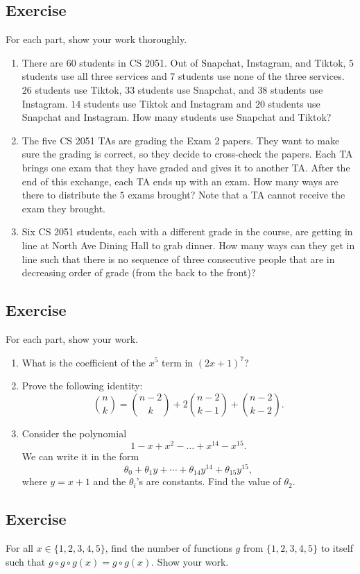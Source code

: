 \documentclass{article}
\newcounter{counter}
\newcommand{\Exercise}{Exercise \stepcounter{counter}\thecounter}
\begin{document}
\subsection*{\Exercise}
    For each part, show your work thoroughly.
    \begin{enumerate}
        \item There are $60$ students in CS 2051. Out of Snapchat, Instagram, and Tiktok, $5$ students use all three services and $7$ students use none of the three services. $26$ students use Tiktok, $33$ students use Snapchat, and $38$ students use Instagram. $14$ students use Tiktok and Instagram and $20$ students use Snapchat and Instagram. How many students use Snapchat and Tiktok?
        \item The five CS 2051 TAs are grading the Exam 2 papers. They want to make sure the grading is correct, so they decide to cross-check the papers. Each TA brings one exam that they have graded and gives it to another TA. After the end of this exchange, each TA ends up with an exam. How many ways are there to distribute the $5$ exams brought? Note that a TA cannot receive the exam they brought.
        \item Six CS 2051 students, each with a different grade in the course, are getting in line at North Ave Dining Hall to grab dinner. How many ways can they get in line such that there is no sequence of three consecutive people that are in decreasing order of grade (from the back to the front)?
    \end{enumerate}

\subsection*{\Exercise}
    For each part, show your work.
    \begin{enumerate}
        \item What is the coefficient of the $x^{5}$ term in $(2x + 1)^{7}$?
        \item Prove the following identity: $$\binom{n}{k} = \binom{n - 2}{k} + 2\binom{n-2}{k-1} + \binom{n-2}{k-2}.$$
        \item Consider the polynomial $$1 - x + x^2 - \dots + x^{14} - x^{15}.$$ We can write it in the form $$\theta_{0} + \theta_{1}y + \cdots + \theta_{14}y^{14} + \theta_{15}y^{15},$$ where $y = x + 1$ and the $\theta_{i}$'s are constants. Find the value of $\theta_{2}$.
    \end{enumerate}

\subsection*{\Exercise}
    For all $x \in \{1,2,3,4,5\}$, find the number of functions $g$ from $\{1,2,3,4,5\}$ to itself such that $g \circ g \circ g(x) = g \circ g(x)$. Show your work.
\end{document}
